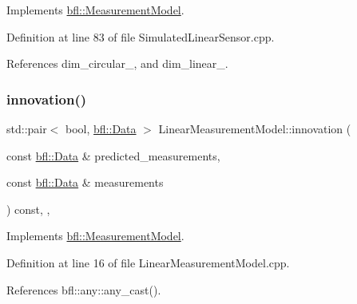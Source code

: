 Implements \mbox{\hyperlink{classbfl_1_1MeasurementModel_a6cca2022b576c9dbb61e73b83a10c6ee}{bfl\+::\+Measurement\+Model}}.



Definition at line 83 of file Simulated\+Linear\+Sensor.\+cpp.



References dim\+\_\+circular\+\_\+, and dim\+\_\+linear\+\_\+.

\mbox{\label{classbfl_1_1LinearMeasurementModel_a12485b4b6d511e97e338a4db6861b277}} 
\subsubsection{\texorpdfstring{innovation()}{innovation()}}
{\footnotesize\ttfamily std\+::pair$<$ bool, \mbox{\hyperlink{namespacebfl_af6b103c6821db1b54452f776fdd9dd02}{bfl\+::\+Data}} $>$ Linear\+Measurement\+Model\+::innovation (\begin{DoxyParamCaption}\item[{const \mbox{\hyperlink{namespacebfl_af6b103c6821db1b54452f776fdd9dd02}{bfl\+::\+Data}} \&}]{predicted\+\_\+measurements,  }\item[{const \mbox{\hyperlink{namespacebfl_af6b103c6821db1b54452f776fdd9dd02}{bfl\+::\+Data}} \&}]{measurements }\end{DoxyParamCaption}) const\hspace{0.3cm}{\ttfamily [override]}, {\ttfamily [virtual]}, {\ttfamily [inherited]}}



Implements \mbox{\hyperlink{classbfl_1_1MeasurementModel_aa06e0643805551a981bcc013ad44c829}{bfl\+::\+Measurement\+Model}}.



Definition at line 16 of file Linear\+Measurement\+Model.\+cpp.



References bfl\+::any\+::any\+\_\+cast().

